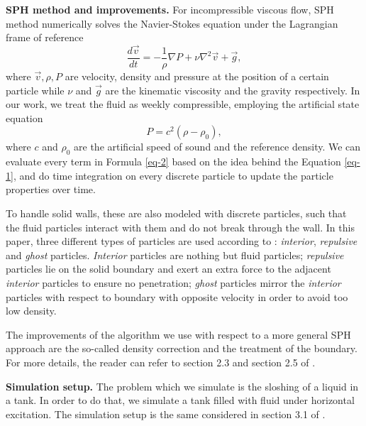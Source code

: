 \documentclass[letterpaper]{article}
\newcommand{\mypar}[1]{{\bf #1.}}
\begin{document}
\mypar{SPH method and improvements}
For incompressible viscous flow, SPH method numerically solves the Navier-Stokes equation under the Lagrangian frame of reference
\begin{equation}\label{eq-2}
    \frac{d\Vec{v}}{dt} = - \frac{1}{\rho}\nabla P + \nu \nabla^{2} \Vec{v} + \Vec{g}, 
\end{equation}
where $\Vec{v}, \rho, P$ are velocity, density and pressure at the position of a certain particle while $\nu$ and $\Vec{g}$ are the kinematic viscosity and the gravity respectively. In our work, we treat the fluid as weekly compressible, employing the artificial state equation
\begin{equation}
    P =  c^{2}(\rho - \rho_0),
\end{equation}
where $c$ and $\rho_0$ are the artificial speed of sound and the reference density. We can evaluate every term in Formula \ref{eq-2} based on the idea behind the Equation \ref{eq-1}, and do time integration on every discrete particle to update the particle properties over time. 

To handle solid walls, these are also modeled with discrete particles, such that the fluid particles interact with them and do not break through the wall. In this paper, three different types of particles are used according to \cite{Shao_Li_Liu_Liu_2012}: \emph{interior}, \emph{repulsive} and \emph{ghost} particles. \emph{Interior} particles are nothing but fluid particles; \emph{repulsive} particles lie on the solid boundary and exert an extra force to the adjacent \emph{interior} particles to ensure no penetration; \emph{ghost} particles mirror the \emph{interior} particles with respect to boundary with opposite velocity in order to avoid too low density.

The improvements of the algorithm we use with respect to a more general SPH approach are the so-called density correction and the treatment of the boundary. For more details, the reader can refer to section 2.3 and section 2.5 of \cite{Shao_Li_Liu_Liu_2012}.

\mypar{Simulation setup}
The problem which we simulate is the sloshing of a liquid in a tank. In order to do that, we simulate a tank filled with fluid under horizontal excitation. The simulation setup is the same considered in section 3.1 of \cite{Shao_Li_Liu_Liu_2012}. 
\end{document}
